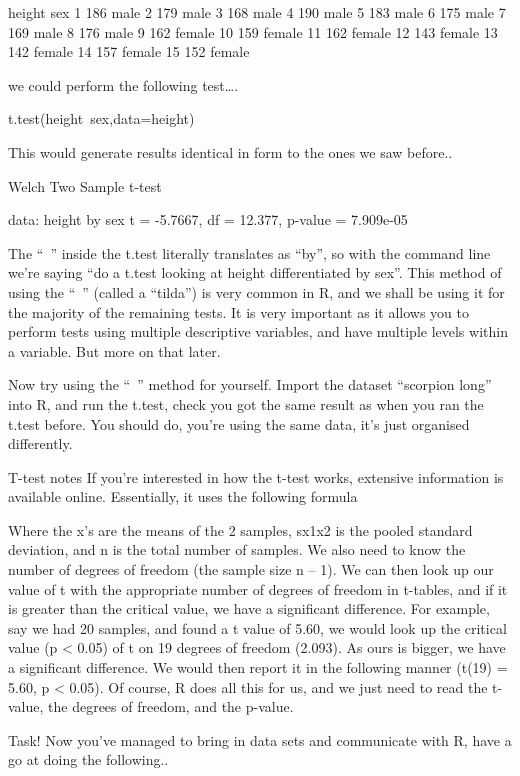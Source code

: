 \documentclass{article}
\begin{document}
height    sex
1     186   male
2     179   male
3     168   male
4     190   male
5     183   male
6     175   male
7     169   male
8     176   male
9     162 female
10    159 female
11    162 female
12    143 female
13    142 female
14    157 female
15    152 female

we could perform the following test….

t.test(height~sex,data=height)

This would generate results identical in form to the ones we saw before..

Welch Two Sample t-test

data:  height by sex 
t = -5.7667, df = 12.377, p-value = 7.909e-05

The “~” inside the t.test literally translates as “by”, so with the command line we’re saying “do a t.test looking at height differentiated by sex”. This method of using the “~” (called a “tilda”) is very common in R, and we shall be using it for the majority of the remaining tests. It is very important as it allows you to perform tests using multiple descriptive variables, and have multiple levels within a variable. But more on that later. 

Now try using the “~” method for yourself. Import the dataset “scorpion long” into R, and run the t.test, check you got the same result as when you ran the t.test before. You should do, you’re using the same data, it’s just organised differently. 


T-test notes
If you’re interested in how the t-test works, extensive information is available online. Essentially, it uses the following formula



Where the x’s are the means of the 2 samples, sx1x2 is the pooled standard deviation, and n is the total number of samples. We also need to know the number of degrees of freedom (the sample size n – 1). We can then look up our value of t with the appropriate number of degrees of freedom in t-tables, and if it is greater than the critical value, we have a significant difference. For example, say we had 20 samples, and found a t value of 5.60, we would look up the critical value (p < 0.05) of t on 19 degrees of freedom (2.093). As ours is bigger, we have a significant difference. We would then report it in the following manner (t(19) = 5.60, p < 0.05). Of course, R does all this for us, and we just need to read the t-value, the degrees of freedom, and the p-value.  

Task! 
Now you’ve managed to bring in data sets and communicate with R, have a go at doing the following..
\end{document}
